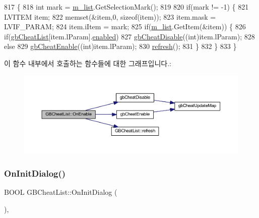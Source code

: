 \begin{DoxyCode}
817 \{
818   \textcolor{keywordtype}{int} mark = \mbox{\hyperlink{class_g_b_cheat_list_aca0eaf2ff30100f5d11e4c80193ad90e}{m\_list}}.GetSelectionMark();
819   
820   \textcolor{keywordflow}{if}(mark != -1) \{
821     LVITEM item;
822     memset(&item,0, \textcolor{keyword}{sizeof}(item));
823     item.mask = LVIF\_PARAM;
824     item.iItem = mark;
825     \textcolor{keywordflow}{if}(\mbox{\hyperlink{class_g_b_cheat_list_aca0eaf2ff30100f5d11e4c80193ad90e}{m\_list}}.GetItem(&item)) \{
826       \textcolor{keywordflow}{if}(\mbox{\hyperlink{gb_cheats_8cpp_a0f6d5312f673bc2e546aed28ea2e20cf}{gbCheatList}}[item.lParam].\mbox{\hyperlink{structgb_cheat_af45ed85e44d6d20c3f0f9be2e2fd8c3b}{enabled}})
827         \mbox{\hyperlink{gb_cheats_8cpp_a5860b5a75e2297e4d2f2f69dde0ad689}{gbCheatDisable}}((\textcolor{keywordtype}{int})item.lParam);
828       \textcolor{keywordflow}{else}
829         \mbox{\hyperlink{gb_cheats_8cpp_aed1bdafc2cfd18d6345102077dcdca76}{gbCheatEnable}}((\textcolor{keywordtype}{int})item.lParam);
830       \mbox{\hyperlink{class_g_b_cheat_list_a248cc28fa5e392d2f55d0f66ff6c5821}{refresh}}();
831     \}       
832   \}
833 \}
\end{DoxyCode}
이 함수 내부에서 호출하는 함수들에 대한 그래프입니다.\+:
\nopagebreak
\begin{figure}[H]
\begin{center}
\leavevmode
\includegraphics[width=350pt]{class_g_b_cheat_list_a3a9af133cd9547881b6f71404ab9171f_cgraph}
\end{center}
\end{figure}
\mbox{\label{class_g_b_cheat_list_a3adbb125356d48a379d2e60609fb775f}} 
\subsubsection{\texorpdfstring{On\+Init\+Dialog()}{OnInitDialog()}}
{\footnotesize\ttfamily B\+O\+OL G\+B\+Cheat\+List\+::\+On\+Init\+Dialog (\begin{DoxyParamCaption}{ }\end{DoxyParamCaption})\hspace{0.3cm}{\ttfamily [protected]}, {\ttfamily [virtual]}}



